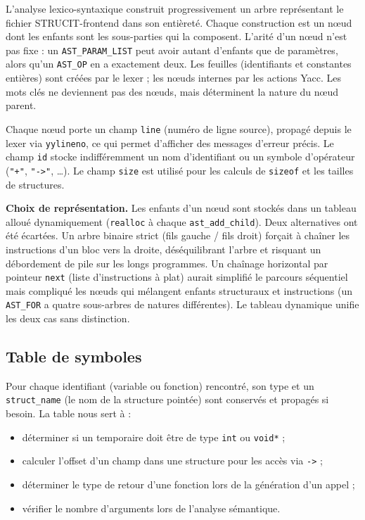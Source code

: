 \documentclass[12pt,a4paper]{article}
\begin{document}
L'analyse lexico-syntaxique construit progressivement un arbre représentant le fichier STRUCIT-frontend dans son entièreté. Chaque construction est un nœud dont les enfants sont les sous-parties qui la composent. L'arité d'un nœud n'est pas fixe : un \texttt{AST\_PARAM\_LIST} peut avoir autant d'enfants que de paramètres, alors qu'un \texttt{AST\_OP} en a exactement deux. Les feuilles (identifiants et constantes entières) sont créées par le lexer ; les nœuds internes par les actions Yacc. Les mots clés ne deviennent pas des nœuds, mais déterminent la nature du nœud parent.

Chaque nœud porte un champ \texttt{line} (numéro de ligne source), propagé depuis le lexer via \texttt{yylineno}, ce qui permet d'afficher des messages d'erreur précis. Le champ \texttt{id} stocke indifféremment un nom d'identifiant ou un symbole d'opérateur (\texttt{"+"}, \texttt{"->"}, …). Le champ \texttt{size} est utilisé pour les calculs de \texttt{sizeof} et les tailles de structures.

\medskip
\textbf{Choix de représentation.} Les enfants d'un nœud sont stockés dans un tableau alloué dynamiquement (\texttt{realloc} à chaque \texttt{ast\_add\_child}). Deux alternatives ont été écartées. Un arbre binaire strict (fils gauche / fils droit) forçait à chaîner les instructions d'un bloc vers la droite, déséquilibrant l'arbre et risquant un débordement de pile sur les longs programmes. Un chaînage horizontal par pointeur \texttt{next} (liste d'instructions à plat) aurait simplifié le parcours séquentiel mais compliqué les nœuds qui mélangent enfants structuraux et instructions (un \texttt{AST\_FOR} a quatre sous-arbres de natures différentes). Le tableau dynamique unifie les deux cas sans distinction.

\subsection{Table de symboles}

Pour chaque identifiant (variable ou fonction) rencontré, son type et un \texttt{struct\_name} (le nom de la structure pointée) sont conservés et propagés si besoin. La table nous sert à :
\begin{itemize}
  \item déterminer si un temporaire doit être de type \texttt{int} ou \texttt{void*} ;
  \item calculer l'offset d'un champ dans une structure pour les accès via \texttt{->} ;
  \item déterminer le type de retour d'une fonction lors de la génération d'un appel ;
  \item vérifier le nombre d'arguments lors de l'analyse sémantique.
\end{itemize}
\end{document}
